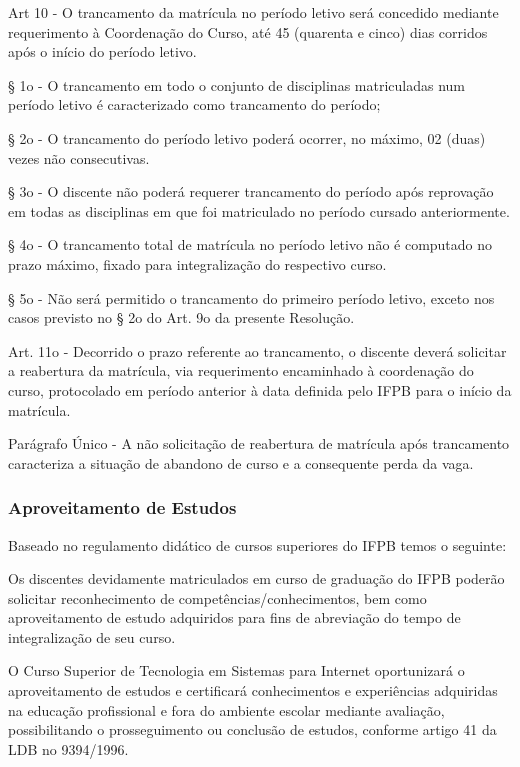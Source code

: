 Art 10 - O trancamento da matrícula no período letivo será concedido mediante requerimento à Coordenação do Curso, até 45 (quarenta e cinco) dias corridos após o início do período letivo.

§ 1o - O trancamento em todo o conjunto de disciplinas matriculadas num período letivo é caracterizado como trancamento do período;

§ 2o - O trancamento do período letivo poderá ocorrer, no máximo, 02 (duas) vezes não consecutivas.

§ 3o - O discente não poderá requerer trancamento do período após reprovação em todas as disciplinas em que foi matriculado no período cursado anteriormente.

§ 4o - O trancamento total de matrícula no período letivo não é computado no prazo máximo, fixado para integralização do respectivo curso.

§ 5o - Não será permitido o trancamento do primeiro período letivo, exceto nos casos previsto no § 2o do Art. 9o da presente Resolução.

Art. 11o - Decorrido o prazo referente ao trancamento, o discente deverá solicitar a reabertura da matrícula, via requerimento encaminhado à coordenação do curso, protocolado em período anterior à data definida pelo IFPB para o início da matrícula.

Parágrafo Único - A não solicitação de reabertura de matrícula após trancamento caracteriza a situação de abandono de curso e a consequente perda da vaga.

\subsubsection{Aproveitamento de Estudos}

Baseado no regulamento didático de cursos superiores do IFPB temos o seguinte:

	Os discentes devidamente matriculados em curso de graduação do IFPB poderão solicitar reconhecimento de competências/conhecimentos, bem como aproveitamento de estudo adquiridos para fins de abreviação do tempo de integralização de seu curso.
	
	O Curso Superior de Tecnologia em Sistemas para Internet oportunizará o aproveitamento de estudos e certificará conhecimentos e experiências adquiridas na educação profissional e fora do ambiente escolar mediante avaliação, possibilitando o prosseguimento ou conclusão de estudos, conforme artigo 41 da LDB no 9394/1996.
	
